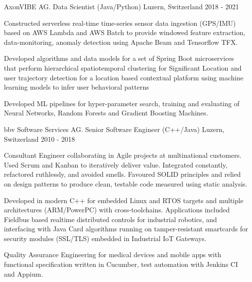 \begin{cventries}
\cventry
  {AxonVIBE AG.} %
  {Data Scientist (Java/Python)} %
  {Luzern, Switzerland} %
  {2018 - 2021} %
  {
    \begin{cvitems} %
      \item {
          Constructed serverless real-time time-series sensor data ingestion (GPS/IMU) based on AWS Lambda and AWS Batch to 
          provide windowed feature extraction, data-monitoring, anomaly detection using 
          Apache Beam and Tensorflow TFX.}
      \item {
          Developed algorithms and data models for a set of Spring Boot microservices that perform hierarchical 
          spatiotemporal clustering for Significant Location and user trajectory detection for a location based contextual platform
          using machine learning models to infer user behavioral patterns}
      \item {
          Developed ML pipelines for hyper-parameter search, training and evaluating of Neural Networks, Random Forests and Gradient Boosting Machines.}
    \end{cvitems}
  }

\cventry
{bbv Software Services AG.} %
{Senior Software Engineer (C++/Java)} %
{Luzern, Switzerland} %
{2010 - 2018} %
{
  \begin{cvitems} %
    \item {
        Consultant Engineer collaborating in Agile projects at multinational
        customers. Used Scrum and Kanban to iteratively deliver 
        value. Integrated constantly, refactored ruthlessly, and avoided smells. 
        Favoured SOLID principles and relied on design patterns to produce clean, 
        testable code measured using static analysis.
        }
    \item {
        Developed in modern C++ for embedded Linux and RTOS targets and 
        multiple architectures (ARM/PowerPC) with cross-toolchains. Applications 
        included Fieldbus based realtime distributed controls for industrial robotics, 
        and interfacing with Java Card algorithms running on tamper-resistant smartcards 
        for security modules (SSL/TLS) embedded in Industrial IoT Gateways.}
    \item {
      Quality Assurance Engineering for medical devices and mobile apps
      with functional specification written in Cucumber, 
      test automation with Jenkins CI and Appium. 
      }  
  \end{cvitems}
}


\end{cventries}
